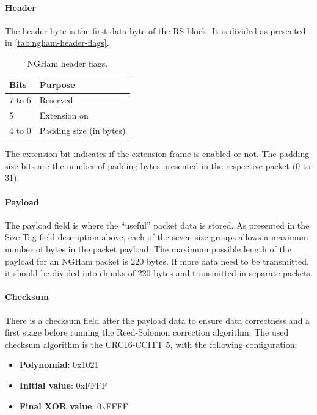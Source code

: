 \paragraph{Header}

The header byte is the first data byte of the RS block. It is divided as presented in \autoref{tab:ngham-header-flags}.

\begin{table}[!ht]
    \centering
    \begin{tabular}{ll}
        \toprule[1.5pt]
        \textbf{Bits} & \textbf{Purpose} \\
        \midrule
        7 to 6  & Reserved \\
        5       & Extension on \\
        4 to 0  & Padding size (in bytes) \\
        \bottomrule[1.5pt]
    \end{tabular}
    \caption{NGHam header flags.}
    \label{tab:ngham-header-flags}
\end{table}

The extension bit indicates if the extension frame is enabled or not. The padding size bits are the number of padding bytes presented in the respective packet (0 to 31).

\paragraph{Payload}

The payload field is where the “useful” packet data is stored. As presented in the Size Tag field description above, each of the seven size groups allows a maximum number of bytes in the packet payload. The maximum possible length of the payload for an NGHam packet is 220 bytes. If more data need to be transmitted, it should be divided into chunks of 220 bytes and transmitted in separate packets.

\paragraph{Checksum}

There is a checksum field after the payload data to ensure data correctness and a first stage before running the Reed-Solomon correction algorithm. The used checksum algorithm is the CRC16-CCITT 5, with the following configuration:

\begin{itemize}
    \item \textbf{Polynomial}: 0x1021
    \item \textbf{Initial value}: 0xFFFF
    \item \textbf{Final XOR value}: 0xFFFF
\end{itemize}

